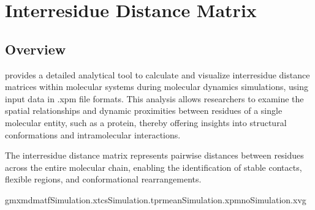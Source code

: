 \documentclass[a4paper,10pt,english]{sphinxmanual}
\begin{document}
\begin{sphinxVerbatim}[commandchars=\\\{\}]
 
      
      
     
\end{sphinxVerbatim}

\sphinxstepscope


\chapter{Inter\sphinxhyphen{}residue Distance Matrix}
\label{\detokenize{DistanceMatrix:inter-residue-distance-matrix}}\label{\detokenize{DistanceMatrix::doc}}

\section{Overview}
\label{\detokenize{DistanceMatrix:overview}}
\sphinxAtStartPar
{} provides a detailed analytical tool to calculate and visualize inter\sphinxhyphen{}residue distance matrices within molecular systems during molecular dynamics simulations, using input data in .xpm file formats. This analysis allows researchers to examine the spatial relationships and dynamic proximities between residues of a single molecular entity, such as a protein, thereby offering insights into structural conformations and intra\sphinxhyphen{}molecular interactions.

\sphinxAtStartPar
The inter\sphinxhyphen{}residue distance matrix represents pairwise distances between residues across the entire molecular chain, enabling the identification of stable contacts, flexible regions, and conformational rearrangements.

\sphinxAtStartPar
{}

\begin{sphinxVerbatim}[commandchars=\\\{\}]
gmxmdmat\PYGZhy{}fSimulation.xtc\PYGZhy{}sSimulation.tpr\PYGZhy{}meanSimulation.xpm\PYGZhy{}noSimulation.xvg
\end{sphinxVerbatim}
\end{document}
